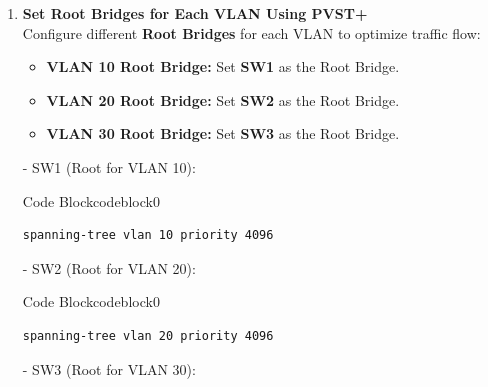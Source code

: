 \documentclass[a4paper]{book}
\begin{document}
\begin{enumerate}

	\item \textbf{Set Root Bridges for Each VLAN Using PVST+} \\
	      Configure different \textbf{Root Bridges} for each VLAN to optimize traffic flow:

	      \begin{itemize}
		      \item \textbf{VLAN 10 Root Bridge:} Set \textbf{SW1} as the Root Bridge.
		      \item \textbf{VLAN 20 Root Bridge:} Set \textbf{SW2} as the Root Bridge.
		      \item \textbf{VLAN 30 Root Bridge:} Set \textbf{SW3} as the Root Bridge.
	      \end{itemize}



	      - SW1 (Root for VLAN 10):



	      \begin{ocg}{Code Block}{codeblock}{0}
		      \vspace{0.5cm}
		      \begin{lstlisting}
spanning-tree vlan 10 priority 4096
\end{lstlisting}

	      \end{ocg}
	      - SW2 (Root for VLAN 20):



	      \begin{ocg}{Code Block}{codeblock}{0}
		      \vspace{0.5cm}
		      \begin{lstlisting}
spanning-tree vlan 20 priority 4096
\end{lstlisting}

	      \end{ocg}
	      - SW3 (Root for VLAN 30):




\end{enumerate}
\end{document}
